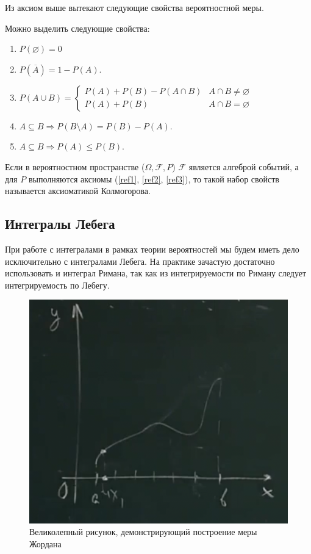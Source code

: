 Из аксиом выше вытекают следующие свойства вероятностной меры.
\begin{theorem}
    Можно выделить следующие свойства:
    \begin{enumerate}
        \item $P(\varnothing) = 0$ 
        \item $P(\overline{A}) = 1 - P(A)$.
        \item $P(A \cup B) = \begin{cases}
        P(A) + P(B) - P(A \cap B) & A \cap B \neq \varnothing \\
        P(A) + P(B)& A \cap B = \varnothing
        \end{cases}$
        \item $A \subseteq B \Rightarrow P(B \setminus A) = P(B) - P(A)$.
        \item $A \subseteq B \Rightarrow P(A) \le P(B)$. 
    \end{enumerate}
\end{theorem}

\begin{definition}
    Если в вероятностном пространстве ($\Omega, \mathcal{F}, P$) 
    $\mathcal{F}$ является алгеброй событий, а для $P$ выполняются аксиомы
    (\ref{ref1}, \ref{ref2}, \ref{ref3}), то такой набор свойств называется
    аксиоматикой Колмогорова.
\end{definition}

\subsection{Интегралы Лебега}
При работе с интегралами в рамках теории вероятностей
мы будем иметь дело исключительно с интегралами Лебега.
На практике зачастую достаточно использовать и 
интеграл Римана, так как из интегрируемости по Риману
следует интегрируемость по Лебегу.
\begin{figure}[H]
    \centering
    \includegraphics[scale=0.5]{images/riemann.png}
    \caption{Великолепный рисунок, демонстрирующий построение 
    меры Жордана}
\end{figure}

